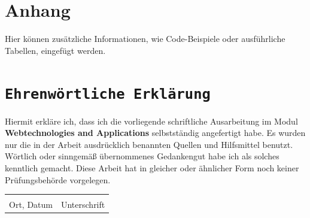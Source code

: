 \documentclass[a4paper,12pt]{article}
\begin{document}
\section{Anhang}
Hier können zusätzliche Informationen, wie Code-Beispiele oder ausführliche Tabellen, eingefügt werden.

\newpage
{}
\section*{\texttt{Ehrenwörtliche Erklärung}}
Hiermit erkläre ich, dass ich die vorliegende schriftliche Ausarbeitung im Modul \textbf{Webtechnologies and Applications} selbstständig
angefertigt habe. Es wurden nur die in der Arbeit ausdrücklich benannten Quellen und
Hilfsmittel benutzt. Wörtlich oder sinngemäß übernommenes Gedankengut habe ich als
solches kenntlich gemacht. Diese Arbeit hat in gleicher oder ähnlicher Form noch keiner
Prüfungsbehörde vorgelegen.

\vspace{3cm}
\noindent\begin{tabular}{p{}p{}}
    \hrulefill & \hrulefill \\
    Ort, Datum & Unterschrift \\
\end{tabular}
\end{document}
